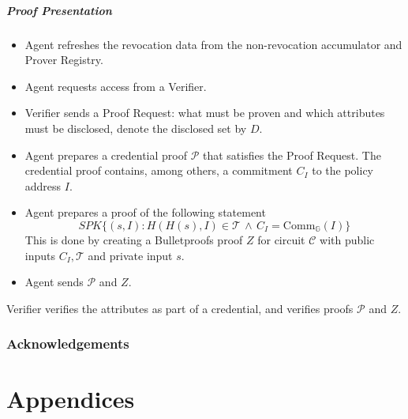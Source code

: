 \documentclass[a4paper]{article}
\begin{document}
\subsubsection{Proof Presentation}

\begin{itemize}
    \item Agent refreshes the revocation data from the non-revocation accumulator and Prover Registry.
    \item Agent requests access from a Verifier.
    \item Verifier sends a Proof Request: what must be proven and which attributes must be disclosed, denote the disclosed set by $D$.
    \item Agent prepares a credential proof $\mathcal{P}$ that satisfies the Proof Request. The credential proof contains, among others, a commitment $C_I$ to the  policy address $I$.
    \item Agent prepares a  proof of the following statement
    $$
    SPK\{(s,I): H(H(s),I)\in \mathcal{T}\,\wedge\,C_I = \mathrm{Comm}_{\mathbb{G}}(I)\}
    $$
    This is done by creating a  Bulletproofs proof $Z$ for circuit $\mathcal{C}$ with public inputs $C_I,\mathcal{T}$ and private input $s$.
    \item Agent sends  $\mathcal{P}$ and $Z$.
\end{itemize}


Verifier verifies the attributes as part of a credential, and verifies proofs  $\mathcal{P}$ and $Z$.



\section{Acknowledgements}




\part{Appendices}
\appendix
\end{document}

